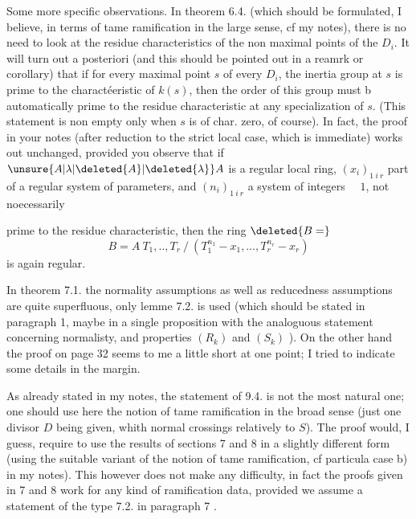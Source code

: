 Some more specific observations. In theorem 6.4. (which should be formulated,
I believe, in terms of tame ramification in the large sense, cf my notes),
there is no need to look at the residue characteristics of the non maximal
points of the $D_i$. It will turn out a posteriori (and this should be pointed
out in a reamrk or corollary) that  if for every maximal point $s$
of every $D_i$, the inertia group at $s$ is prime
to the charactéeristic of $k(s)$, then the order of this group must
b automatically prime to the residue
characteristic at any specialization of $s$. (This statement is non empty only
when $s$ is of char. zero, of course). In fact, the proof in your notes (after
reduction to the strict local case, which is immediate) works out unchanged,
provided you observe that if
$\unsure{A|\lambda|\deleted{A}|\deleted{\lambda}}A$ is a
regular local ring, $(x_i)_{1\ i\ r}$ part of a regular system of parameters,
and $(n_i)_{1\ i\ r}$ a system of integers $\quad1$,
not noecessarily

prime to the residue characteristic, then the ring $\deleted{B=}$
\[
B=A\ T_1,..,T_r\ /\ (T_1^{n_1}-x_1,\ldots,T_r^{n_r}-x_r)
\]
is again regular.

In theorem 7.1. the normality assumptions as well as reducedness assumptions are quite superfluous, only lemme 7.2. is used (which should be stated in paragraph 1, maybe in a single proposition with the analoguous statement concerning normalisty, and properties $(R_k)$ and $(S_k)$ ). On the other hand the proof on page 32 seems to me  a little short at one point; I tried to indicate some details in the margin.

As already stated in my notes, the statement of 9.4. is not the most natural one; one should use here the notion of tame ramification in the broad sense (just one divisor $D$ being given, whith normal crossings relatively to $S$).  The proof would, I guess, require to use the results of sections 7 and 8 in a slightly different form (using the suitable variant of the notion of tame ramification, cf  particula
case b) in my notes). This however does not make any difficulty, in fact the proofs given in 7 and 8 work for any kind of ramification data, provided we assume a statement of the type 7.2. in paragraph 7 .

